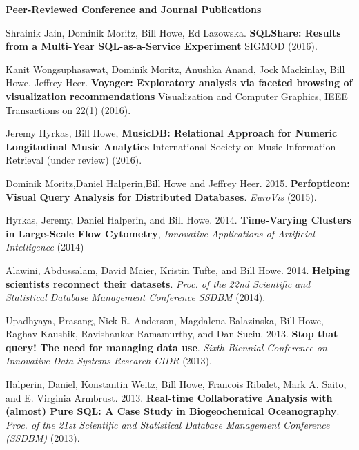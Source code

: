 
{\bf Peer-Reviewed Conference and Journal Publications}
\begin{bulletlist}

\item Shrainik Jain, Dominik Moritz, Bill Howe, Ed Lazowska. 
\textbf{SQLShare: Results from a Multi-Year SQL-as-a-Service Experiment}
SIGMOD (2016).

\item Kanit Wongsuphasawat, Dominik Moritz, Anushka Anand, Jock Mackinlay, Bill Howe, Jeffrey Heer. 
\textbf{Voyager: Exploratory analysis via faceted browsing of visualization recommendations}
Visualization and Computer Graphics, IEEE Transactions on 22(1) (2016).

\item  Jeremy Hyrkas, Bill Howe, \textbf{MusicDB: Relational Approach for Numeric Longitudinal Music Analytics}
International Society on Music Information Retrieval (under review) (2016).

\item Dominik Moritz,Daniel Halperin,Bill Howe and Jeffrey Heer. 2015.
\textbf{Perfopticon: Visual Query Analysis for Distributed Databases}.
\emph{EuroVis} (2015).

\item Hyrkas, Jeremy, Daniel Halperin, and Bill Howe. 2014. 
\textbf{Time-Varying Clusters in Large-Scale Flow Cytometry}, \emph{Innovative Applications of Artificial Intelligence} (2014)

\item Alawini, Abdussalam, David Maier, Kristin Tufte, and Bill Howe. 2014. 
\textbf{Helping scientists reconnect their datasets}. \emph{Proc. of the 22nd 
Scientific and Statistical Database Management Conference SSDBM} (2014).

\item Upadhyaya, Prasang, Nick R. Anderson, Magdalena Balazinska, Bill
Howe, Raghav Kaushik, Ravishankar Ramamurthy, and Dan Suciu. 2013. \textbf{Stop
that query! The need for managing data use}. \emph{Sixth Biennial Conference 
on Innovative Data Systems Research {CIDR}} (2013).

\item Halperin, Daniel, Konstantin Weitz, Bill Howe, Francois Ribalet, Mark A. Saito,
and E. Virginia Armbrust. 2013. \textbf{Real-time Collaborative Analysis with
(almost) Pure SQL: A Case Study in Biogeochemical Oceanography}.
\emph{Proc. of the 21st Scientific and Statistical
Database Management Conference (SSDBM)} (2013). 


\end{bulletlist}
